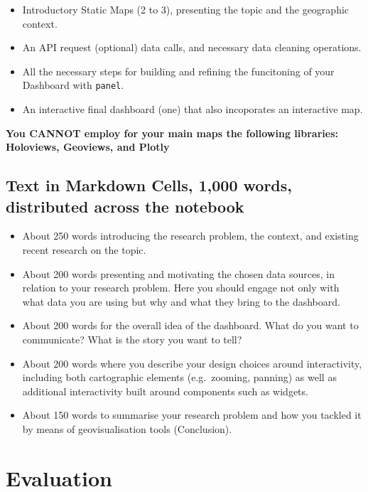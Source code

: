 \documentclass[
  letterpaper,
  DIV=11,
  numbers=noendperiod]{scrreprt}
\providecommand{\tightlist}{%
  \setlength{\itemsep}{0pt}\setlength{\parskip}{0pt}}\usepackage{longtable,booktabs,array}
\begin{document}
\begin{itemize}
\tightlist
\item
  Introductory Static Maps (2 to 3), presenting the topic and the
  geographic context.
\item
  An API request (optional) data calls, and necessary data cleaning
  operations.
\item
  All the necessary steps for building and refining the funcitoning of
  your Dashboard with \texttt{panel}.
\item
  An interactive final dashboard (one) that also incoporates an
  interactive map.
\end{itemize}

\textbf{You CANNOT employ for your main maps the following libraries:
Holoviews, Geoviews, and Plotly}

\subsection*{Text in Markdown Cells, 1,000 words, distributed across the
notebook}\label{text-in-markdown-cells-1000-words-distributed-across-the-notebook-1}

\begin{itemize}
\tightlist
\item
  About 250 words introducing the research problem, the context, and
  existing recent research on the topic.
\item
  About 200 words presenting and motivating the chosen data sources, in
  relation to your research problem. Here you should engage not only
  with what data you are using but why and what they bring to the
  dashboard.
\item
  About 200 words for the overall idea of the dashboard. What do you
  want to communicate? What is the story you want to tell?
\item
  About 200 words where you describe your design choices around
  interactivity, including both cartographic elements (e.g.~zooming,
  panning) as well as additional interactivity built around components
  such as widgets.
\item
  About 150 words to summarise your research problem and how you tackled
  it by means of geovisualisation tools (Conclusion).
\end{itemize}

\section*{Evaluation}\label{evaluation}
\end{document}
